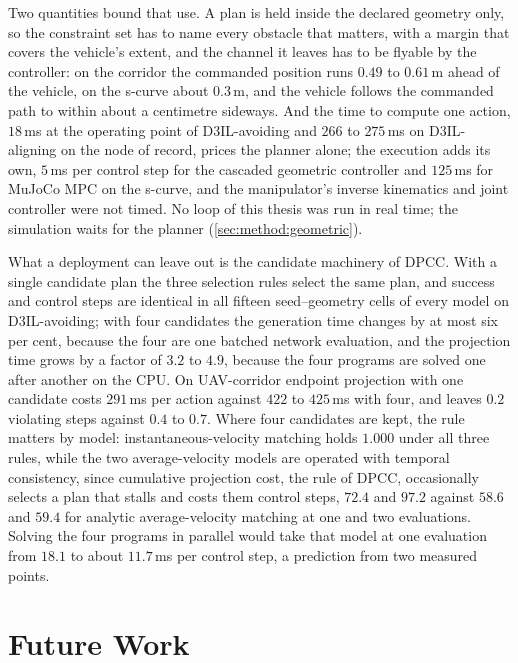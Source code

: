 Two quantities bound that use. A plan is held inside the declared geometry only, so the constraint set
has to name every obstacle that matters, with a margin that covers the vehicle's extent, and the
channel it leaves has to be flyable by the controller: on the corridor the commanded position runs
$0.49$ to $0.61$\,m ahead of the vehicle, on the s-curve about $0.3$\,m, and the vehicle follows the
commanded path to within about a centimetre sideways. And the time to compute one action, $18$\,ms at
the operating point of D3IL-avoiding and $266$ to $275$\,ms on D3IL-aligning on the node of record,
prices the planner alone; the execution adds its own, $5$\,ms per control step for the cascaded
geometric controller and $125$\,ms for MuJoCo MPC on the s-curve, and the manipulator's inverse
kinematics and joint controller were not timed. No loop of this thesis was run in real time;
the simulation waits for the planner (\autoref{sec:method:geometric}).

What a deployment can leave out is the candidate machinery of \ac{DPCC}. With a single candidate plan
the three selection rules select the same plan, and success and control steps are identical in all
fifteen seed--geometry cells of every model on D3IL-avoiding; with four candidates the generation time
changes by at most six per cent, because the four are one batched network evaluation, and the
projection time grows by a factor of $3.2$ to $4.9$, because the four programs are solved one after
another on the CPU. On UAV-corridor endpoint projection with one candidate costs $291$\,ms per action
against $422$ to $425$\,ms with four, and leaves $0.2$ violating steps against $0.4$ to $0.7$. Where
four candidates are kept, the rule matters by model: instantaneous-velocity matching holds $1.000$
under all three rules, while the two average-velocity models are operated with temporal consistency,
since cumulative projection cost, the rule of \ac{DPCC}, occasionally selects a plan that stalls and
costs them control steps, $72.4$ and $97.2$ against $58.6$ and $59.4$ for analytic average-velocity
matching at one and two evaluations. Solving the four programs in parallel would take that model at
one evaluation from $18.1$ to about $11.7$\,ms per control step, a prediction from two measured points.

\section{Future Work}\label{sec:disc:future}

